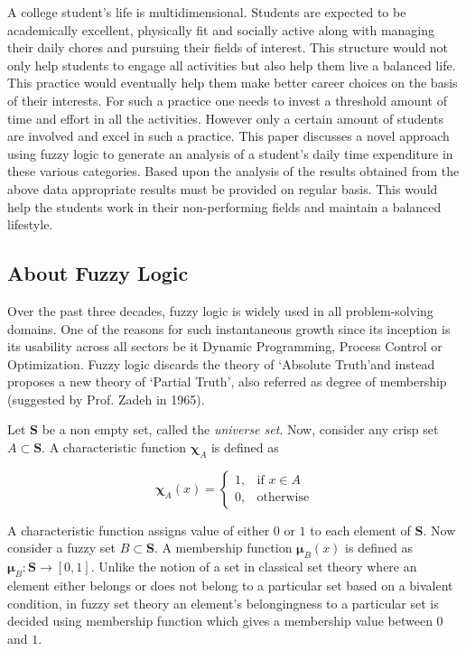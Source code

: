 \documentclass[conference]{IEEEtran}
\begin{document}
A college student\rq s life is multidimensional. Students are expected to be academically excellent, physically fit and socially active along with managing their daily chores and pursuing their fields of interest. This structure would not only help students to engage all activities but also help them live a balanced life. This practice would eventually help them make better career choices on the basis of their interests. For such a practice one needs to invest a threshold amount of time and effort in all the activities. However only a certain amount of students are involved and excel in such a practice. This paper discusses a novel approach using fuzzy logic to generate an analysis of a student\rq s daily time expenditure in these various categories. Based upon the analysis of the results obtained from the above data appropriate results must be provided on regular basis. This would help the students work in their non-performing fields and maintain a balanced lifestyle.

\subsection{About Fuzzy Logic}

Over the past three decades, fuzzy logic is widely used in all problem-solving domains. One of the reasons for such instantaneous growth since its inception is its usability across all sectors be it Dynamic Programming, Process Control or Optimization. Fuzzy logic discards the theory of \lq Absolute Truth\rq and instead proposes a new theory of \lq Partial Truth\rq, also referred as degree of membership (suggested by Prof. Zadeh in 1965).

Let $\mathbf{S}$ be a non empty set, called the \textit{universe set}. Now, consider any crisp set $A \subset \mathbf{S}$. A characteristic function $\mathbold{\chi}_A$ is defined as

$$
\mathbold{\chi}_A(x) = 
\begin{cases}
    1, & \text{if } x\in A\\
    0, & \text{otherwise}
\end{cases}
$$

A characteristic function assigns value of either $0$ or $1$ to each element of $\mathbf{S}$. Now consider a fuzzy set $B \subset \mathbf{S}$. A membership function $\mathbold{\mu}_B(x)$ is defined as $\mathbold{\mu}_B:\mathbf{S}\rightarrow[0, 1]$. Unlike the notion of a set in classical set theory where an element either belongs or does not belong to a particular set based on a bivalent condition, in fuzzy set theory an element\rq s belongingness to a particular set is decided using membership function which gives a membership value between $0$ and $1$.
\end{document}
